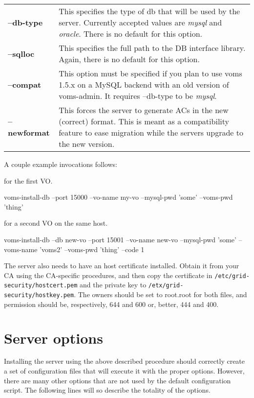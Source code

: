 \documentclass[a4paper]{book}
\begin{document}
\begin{longtable}{lp{3in}}
\textbf{--db-type} & This specifies the type of db that will be used by
the server.  Currently accepted values are \emph{mysql} and \emph{oracle}.
There is no default for this option.\\
\textbf{--sqlloc} & This specifies the full path to the DB interface library.
Again, there is no default for this option.\\
\textbf{--compat} & This option must be specified if you plan to use
voms 1.5.x on a MySQL backend with an old version of voms-admin.  It
requires --db-type to be \emph{mysql}.\\
\textbf{--newformat} & This forces the server to generate ACs in the new 
(correct) format.  This is meant as a compatibility feature to ease migration 
while the servers upgrade to the new version.\\
\end{longtable}

A couple example invocations follows:

for the first VO.

voms-install-db --port 15000 --vo-name my-vo --mysql-pwd 'some' --voms-pwd 'thing'

for a second VO on the same host.

voms-install-db --db new-vo --port 15001 --vo-name new-vo --mysql-pwd
'some' --voms-name 'voms2' --voms-pwd 'thing' --code 1

The server also needs to have an host certificate installed.  Obtain
it from your CA using the CA-specific procedures, and then copy the
certificate in \verb|/etc/grid-security/hostcert.pem| and the private
key to \verb|/etx/grid-security/hostkey.pem|.  The owners should be
set to root.root for both files, and permission should be,
respectively, 644 and 600 or, better, 444 and 400.

\section{Server options}
Installing the server using the above described procedure should
correctly create a set of configuration files that will execute it
with the proper options.  However, there are many other options that
are not used by the default configuration script.  The following lines
will so describe the totality of the options.
\end{document}
